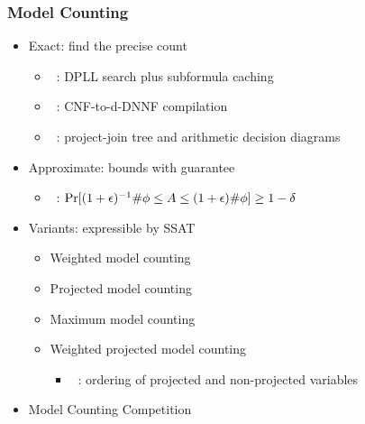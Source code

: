 \begin{frame}
      \frametitle{Model Counting}
      \begin{itemize}
            \item Exact: find the precise count
                  \pause
                  \begin{itemize}
                        \item \cachet~\cite{Sang2004,Sang2005ModelCounting}: DPLL search plus subformula caching
                              \pause
                        \item \ctwod~\cite{Darwiche2001,Darwiche2002dDNNF}: CNF-to-d-DNNF compilation
                              \pause
                        \item \dpmc~\cite{Dudek2020}: project-join tree and arithmetic decision diagrams
                              \pause
                  \end{itemize}
            \item Approximate: bounds with guarantee
                  \pause
                  \begin{itemize}
                        \item \approxmc~\cite{Chakraborty2013,Chakraborty2016}: $\Pr[(1+\epsilon)^{-1}\#\phi \leq A \leq (1+\epsilon)\#\phi] \geq 1-\delta$
                              \pause
                  \end{itemize}
            \item Variants: expressible by SSAT
                  \pause
                  \begin{itemize}
                        \item Weighted model counting~\cite{Sang2005BayesianInference,Chavira2008}
                              \pause
                        \item Projected model counting~\cite{Aziz2015}
                              \pause
                        \item Maximum model counting~\cite{Fremont2017}
                              \pause
                        \item Weighted projected model counting
                              \pause
                              \begin{itemize}
                                    \item \procount~\cite{Dudek2021}: ordering of projected and non-projected variables
                                          \pause
                              \end{itemize}
                  \end{itemize}
            \item Model Counting Competition~\cite{MC-COMP2020}
      \end{itemize}
\end{frame}

